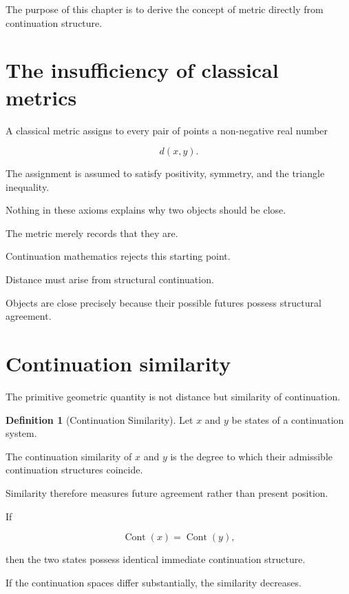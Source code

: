 \documentclass[13pt,openany]{book}
\theoremstyle{plain}
\theoremstyle{definition}
\newtheorem{definition}{Definition}[chapter]
\begin{document}
The purpose of this chapter is to derive the concept of metric directly from continuation structure.


\section{The insufficiency of classical metrics}

A classical metric assigns to every pair of points a non-negative real number

\[
d(x,y).
\]

The assignment is assumed to satisfy positivity, symmetry, and the triangle inequality.

Nothing in these axioms explains why two objects should be close.

The metric merely records that they are.

Continuation mathematics rejects this starting point.

Distance must arise from structural continuation.

Objects are close precisely because their possible futures possess structural agreement.


\section{Continuation similarity}

The primitive geometric quantity is not distance but similarity of continuation.

\begin{definition}[Continuation Similarity]
Let $x$ and $y$ be states of a continuation system.

The continuation similarity of $x$ and $y$ is the degree to which their admissible continuation structures coincide.
\end{definition}

Similarity therefore measures future agreement rather than present position.

If

\[
\operatorname{Cont}(x)
=
\operatorname{Cont}(y),
\]

then the two states possess identical immediate continuation structure.

If the continuation spaces differ substantially, the similarity decreases.
\end{document}

